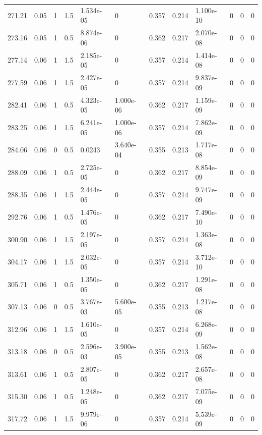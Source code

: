 \documentclass[preview]{standalone}
\begin{document}
{{{\begin{tabular}{L{1.2cm}C{1.2cm} C{0.3cm}C{0.5cm} C{1.4cm}C{1.4cm} C{1.4cm}C{1.4cm} C{1.6cm}C{1.6cm} C{1.6cm}C{1.6cm}}
  271.21  &  0.05  & 1     & 1.5 &  1.534e-05  & 0  &  0.357&   0.214& 1.100e-10 & 0   &  0 & 0  \\ 
  273.16  &  0.05  & 1     & 0.5 &  8.874e-06  & 0  &  0.362&   0.217& 2.070e-08 & 0   &  0 & 0  \\ 
  277.14  &  0.06  & 1     & 1.5 &  2.185e-05  & 0  &  0.357&   0.214& 1.414e-08 & 0   &  0 & 0  \\ 
  277.59  &  0.06  & 1     & 1.5 &  2.427e-05  & 0  &  0.357&   0.214& 9.837e-09 & 0   &  0 & 0  \\ 
  282.41  &  0.06  & 1     & 0.5 &  4.323e-05  & 1.000e-06  &  0.362&   0.217& 1.159e-09 & 0   &  0 & 0  \\ 
  283.25  &  0.06  & 1     & 1.5 &  6.241e-05  & 1.000e-06  &  0.357&   0.214& 7.862e-09 & 0   &  0 & 0  \\ 
  284.06  &  0.06  & 0     & 0.5 &  0.0243  & 3.640e-04  &  0.355&   0.213& 1.717e-08 & 0   &  0 & 0  \\ 
  288.09  &  0.06  & 1     & 0.5 &  2.725e-05  & 0  &  0.362&   0.217& 8.854e-09 & 0   &  0 & 0  \\ 
  288.35  &  0.06  & 1     & 1.5 &  2.444e-05  & 0  &  0.357&   0.214& 9.747e-09 & 0   &  0 & 0  \\ 
  292.76  &  0.06  & 1     & 0.5 &  1.476e-05  & 0  &  0.362&   0.217& 7.490e-10 & 0   &  0 & 0  \\ 
  300.90  &  0.06  & 1     & 1.5 &  2.197e-05  & 0  &  0.357&   0.214& 1.363e-08 & 0   &  0 & 0  \\ 
  304.17  &  0.06  & 1     & 1.5 &  2.032e-05  & 0  &  0.357&   0.214& 3.712e-10 & 0   &  0 & 0  \\ 
  305.71  &  0.06  & 1     & 0.5 &  1.350e-05  & 0  &  0.362&   0.217& 1.291e-08 & 0   &  0 & 0  \\ 
  307.13  &  0.06  & 0     & 0.5 &  3.767e-03  & 5.600e-05  &  0.355&   0.213& 1.217e-08 & 0   &  0 & 0  \\ 
  312.96  &  0.06  & 1     & 1.5 &  1.610e-05  & 0  &  0.357&   0.214& 6.268e-09 & 0   &  0 & 0  \\ 
  313.18  &  0.06  & 0     & 0.5 &  2.596e-03  & 3.900e-05  &  0.355&   0.213& 1.562e-08 & 0   &  0 & 0  \\ 
  313.61  &  0.06  & 1     & 0.5 &  2.807e-05  & 0  &  0.362&   0.217& 2.657e-08 & 0   &  0 & 0  \\ 
  315.30  &  0.06  & 1     & 0.5 &  1.248e-05  & 0  &  0.362&   0.217& 7.075e-09 & 0   &  0 & 0  \\ 
  317.72  &  0.06  & 1     & 1.5 &  9.979e-06  & 0  &  0.357&   0.214& 5.539e-09 & 0   &  0 & 0  \\ 

\end{tabular}}}}
\end{document}
